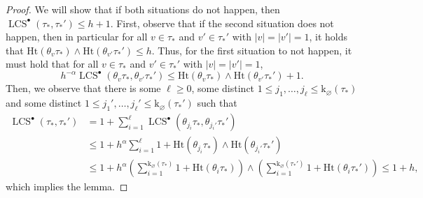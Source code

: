 \documentclass[11pt,reqno]{amsart}
\newcommand{\1}{\mathbf{1}}
\newcommand{\0}{\mathbf{0}}
\newcommand{\Ht}{\mathrm{Ht}}
\newcommand{\rk}{\mathrm{k}}
\newcommand{\LCS}{\operatorname{LCS}}
\begin{document}
\begin{proof}
  We will show that if both situations do not happen, then  $\LCS^\bullet(\tau_*,\tau_*')\le h+1$. First, observe that if the second situation does not happen, then in particular for all $v\in \tau_*$ and $v'\in \tau_*'$ with $|v|=|v'|=1$, it holds that $\Ht(\theta_v\tau_*)\wedge \Ht(\theta_{v'}\tau_*')\le h$. Thus, for the first situation to not happen, it must hold that for all $v\in \tau_*$ and $v'\in \tau_*'$ with $|v|=|v'|=1$, 
    \[h^{-\alpha}\LCS^\bullet(\theta_v\tau_*,\theta_{v'}\tau_*')\leq \Ht(\theta_v\tau_*)\wedge \Ht(\theta_{v'}\tau_*')+1.\]
    Then, we observe that there is some $\ell\ge 0$, some distinct $1\le j_1,\dots, j_\ell\le \rk_\varnothing(\tau_*)$ and some distinct $1\le j_1',\dots,j_\ell'\le \rk_\varnothing(\tau_*')$ such that 
    \begin{align*}\LCS^\bullet(\tau_*,\tau_*')&=1+\sum_{i=1}^\ell \LCS^\bullet(\theta_{j_i}\tau_*,\theta_{j_i'}\tau_*')\\
    &\le 1+h^\alpha \sum_{i=1}^\ell 1+ \Ht(\theta_{j_i}\tau_*)\wedge \Ht(\theta_{j_i'}\tau_*')\\
    &\le 1+h^\alpha \left(\sum_{i=1}^{\rk_\varnothing(\tau_*)}1+\Ht(\theta_i\tau_*)\right)\wedge \left(\sum_{i=1}^{\rk_\varnothing(\tau_*')}1+\Ht(\theta_i\tau_*')\right)\le 1+h,
    \end{align*}
    which implies the lemma.
\end{proof}
\end{document}
